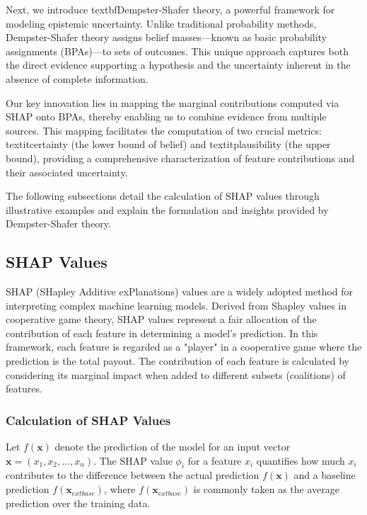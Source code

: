 \documentclass[acmlarge]{acmart}
\begin{document}
Next, we introduce textbf{Dempster-Shafer theory}, a powerful framework for modeling epistemic uncertainty. Unlike traditional probability methods, Dempster-Shafer theory assigns belief masses—known as basic probability assignments (BPAs)—to sets of outcomes. This unique approach captures both the direct evidence supporting a hypothesis and the uncertainty inherent in the absence of complete information.

Our key innovation lies in mapping the marginal contributions computed via SHAP onto BPAs, thereby enabling us to combine evidence from multiple sources. This mapping facilitates the computation of two crucial metrics: textit{certainty} (the lower bound of belief) and textit{plausibility} (the upper bound), providing a comprehensive characterization of feature contributions and their associated uncertainty.

The following subsections detail the calculation of SHAP values through illustrative examples and explain the formulation and insights provided by Dempster-Shafer theory.


\subsection{SHAP Values}

SHAP (SHapley Additive exPlanations) values are a widely adopted method for interpreting complex machine learning models. Derived from Shapley values in cooperative game theory, SHAP values represent a fair allocation of the contribution of each feature in determining a model's prediction. In this framework, each feature is regarded as a "player" in a cooperative game where the prediction is the total payout. The contribution of each feature is calculated by considering its marginal impact when added to different subsets (coalitions) of features.

\subsubsection{Calculation of SHAP Values}

Let \( f(\mathbf{x}) \) denote the prediction of the model for an input vector \( \mathbf{x} = (x_1, x_2, \dots, x_n) \). The SHAP value \( \phi_i \) for a feature \( x_i \) quantifies how much \( x_i \) contributes to the difference between the actual prediction \( f(\mathbf{x}) \) and a baseline prediction \( f(\mathbf{x}_{ext{base}}) \), where \( f(\mathbf{x}_{ext{base}}) \) is commonly taken as the average prediction over the training data.
\end{document}
